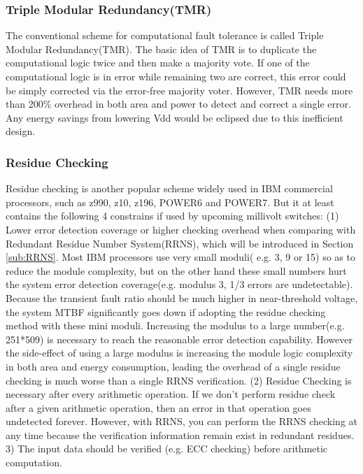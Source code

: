 \documentclass{sig-alternate}
\begin{document}
\subsubsection{Triple Modular Redundancy(TMR)}
The conventional scheme for computational fault tolerance is called Triple Modular Redundancy(TMR)\cite{von1956probabilistic}. 
The basic idea of TMR is to duplicate the computational logic twice and then make a majority vote. If one of the computational logic is in error while remaining two are correct, this error could be simply corrected via the error-free majority voter.  However, TMR needs more than 200\% overhead in both area and power to detect and correct a single error. Any energy savings from lowering Vdd would be eclipsed due to this inefficient design. 

\subsubsection{Residue Checking}
Residue checking is another popular scheme widely used in IBM commercial processors, such as z990, z10, z196, POWER6 and POWER7\cite{ResidueCheck2011,IBMzEnterprise2011,Power6,Power7}. But it at least contains the following 4 constrains if used by upcoming millivolt switches: 
(1) Lower error detection coverage or higher checking overhead when comparing with Redundant Residue Number System(RRNS), which will be introduced in Section \ref{sub:RRNS}. Most IBM processors use very small moduli( e.g. 3, 9 or 15) so as to reduce the module complexity, but on the other hand these small numbers hurt the system error detection coverage(e.g. modulus 3, 1/3 errors are undetectable). Because the transient fault ratio should be much higher in near-threshold voltage, the system MTBF significantly goes down if adopting the residue checking method with these mini moduli. Increasing the modulus to a large number(e.g. 251*509) is necessary to reach the reasonable error detection capability. However the side-effect of using a large modulus is increasing the module logic complexity in both area and energy consumption, leading the overhead of a single residue checking is much worse than a single RRNS verification. 
(2) Residue Checking is necessary after every arithmetic operation.
If we don't perform residue check after a given arithmetic operation, then an error in that operation goes undetected forever. However, with RRNS, you can perform the RRNS checking at any time because the verification information remain exist in redundant residues.
3) The input data should be verified (e.g. ECC checking) before arithmetic computation.
\end{document}
